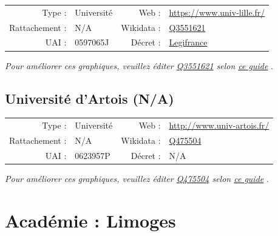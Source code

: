 \documentclass[12pt,french,landscape]{article}
\begin{document}
\begin{tabular*}{0.45\textwidth}{rp{2cm}rl}  
\hline  
Type : & Université & Web : &\href{https://www.univ-lille.fr/}{https://www.univ-lille.fr/} \\  
Rattachement : & N/A & Wikidata : & \href{https://www.wikidata.org/entity/Q3551621}{Q3551621} \\  
UAI : & 0597065J & Décret : & \href{https://www.legifrance.gouv.fr/affichTexte.do?cidTexte=JORFTEXT000035543008}{Legifrance} \\  
\hline  
\end{tabular*}

\textit{\scriptsize Pour améliorer ces graphiques, veuillez éditer \href{https://www.wikidata.org/entity/Q3551621}{Q3551621}  selon \href{https://github.com/cpesr/wikidataESR/blob/master/Rmd/wikidataESR.md}{ce guide}}
.


\newpage

\hypertarget{universituxe9-dartois-na}{%
\subsection{Université d'Artois (N/A)}\label{universituxe9-dartois-na}}

\begin{tabular*}{0.45\textwidth}{rp{2cm}rl}  
\hline  
Type : & Université & Web : &\href{http://www.univ-artois.fr/}{http://www.univ-artois.fr/} \\  
Rattachement : & N/A & Wikidata : & \href{https://www.wikidata.org/entity/Q475504}{Q475504} \\  
UAI : & 0623957P & Décret : & N/A \\  
\hline  
\end{tabular*}

\textit{\scriptsize Pour améliorer ces graphiques, veuillez éditer \href{https://www.wikidata.org/entity/Q475504}{Q475504}  selon \href{https://github.com/cpesr/wikidataESR/blob/master/Rmd/wikidataESR.md}{ce guide}}
.


\newpage

\hypertarget{acaduxe9mie-limoges}{%
\section{Académie : Limoges}\label{acaduxe9mie-limoges}}
\end{document}
